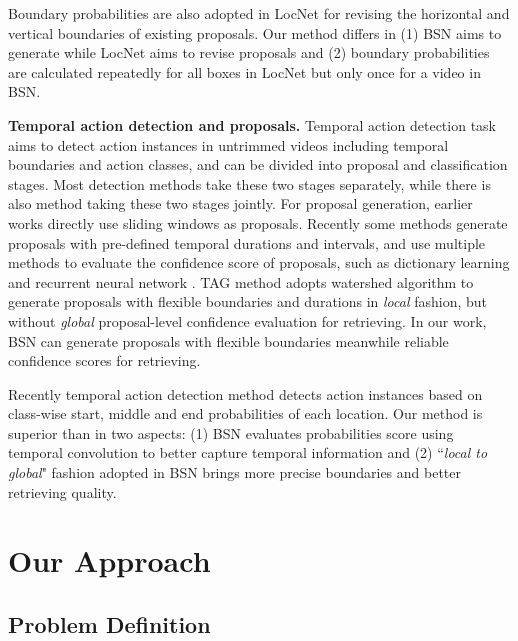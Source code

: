 \documentclass[runningheads]{llncs}
\begin{document}
Boundary probabilities are also adopted in LocNet \cite{gidaris2016locnet} for revising the horizontal and vertical boundaries of existing proposals. Our method differs in (1) BSN aims to generate while LocNet aims to revise proposals and (2) boundary probabilities are calculated repeatedly for all boxes  in LocNet but only once for a video  in BSN.



\noindent
{\bf Temporal action detection and proposals.} 
Temporal action detection task aims to detect action instances in untrimmed videos including temporal boundaries and action classes, and can be divided into proposal and classification stages.
Most detection methods \cite{shou2016action,singh2016untrimmed,zhao2017temporal} take these two stages separately, while there is also method \cite{ssad,sstad} taking these two stages jointly.
For proposal generation, earlier works \cite{karaman2014fast,oneata2014lear,wang2014action} directly use sliding windows as proposals. Recently some methods \cite{sst_buch_cvpr17,fast_temporal_activity_cvpr16,escorcia2016daps,gao2017turn,shou2016action} generate proposals with  pre-defined temporal durations and intervals, and use multiple methods to evaluate the confidence score of proposals, such as dictionary learning \cite{fast_temporal_activity_cvpr16} and recurrent neural network \cite{escorcia2016daps}.
TAG method \cite{zhao2017temporal} adopts watershed algorithm to generate proposals with flexible boundaries and durations in \emph{local} fashion, but without \emph{global} proposal-level confidence evaluation for retrieving. In our work, BSN can generate proposals with flexible boundaries meanwhile reliable confidence scores for retrieving.

Recently temporal action detection method \cite{yuan2017temporal} detects action instances based on class-wise start, middle and end probabilities of each location. Our method is superior than \cite{yuan2017temporal} in two aspects: (1) BSN evaluates probabilities score using temporal convolution to better capture temporal information  and (2) ``\emph{local to global}" fashion adopted in BSN brings more precise boundaries and better retrieving quality.



\section{Our Approach}


\subsection{Problem Definition}
\end{document}
